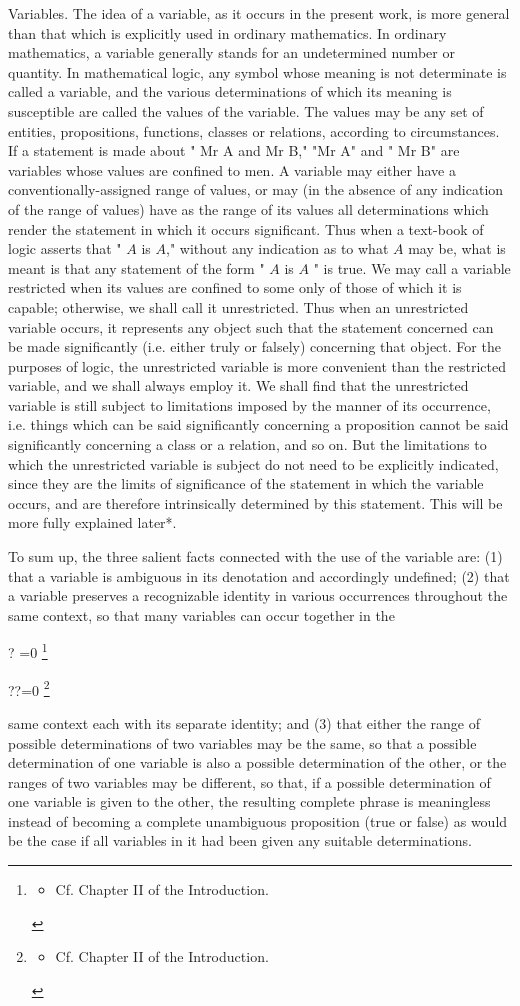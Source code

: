 \documentclass[10pt]{article}
\let\svthefootnote\thefootnote
\newcommand\blfootnotetext[1]{%
  \let\thefootnote\relax\footnote{#1}%
  \addtocounter{footnote}{-1}%
  \let\thefootnote\svthefootnote%
}
\let\svfootnotetext\footnotetext
\renewcommand\footnotetext[2][?]{%
  \if\relax#1\relax%
    \ifnum\value{footnote}=0\blfootnotetext{#2}\else\svfootnotetext{#2}\fi%
  \else%
    \if?#1\ifnum\value{footnote}=0\blfootnotetext{#2}\else\svfootnotetext{#2}\fi%
    \else\svfootnotetext[#1]{#2}\fi%
  \fi
}
\begin{document}
Variables. The idea of a variable, as it occurs in the present work, is more general than that which is explicitly used in ordinary mathematics. In ordinary mathematics, a variable generally stands for an undetermined number or quantity. In mathematical logic, any symbol whose meaning is not determinate is called a variable, and the various determinations of which its meaning is susceptible are called the values of the variable. The values may be any set of entities, propositions, functions, classes or relations, according to circumstances. If a statement is made about " Mr A and Mr B," "Mr A" and " Mr B" are variables whose values are confined to men. A variable may either have a conventionally-assigned range of values, or may (in the absence of any indication of the range of values) have as the range of its values all determinations which render the statement in which it occurs significant. Thus when a text-book of logic asserts that " $A$ is $A$," without any indication as to what $A$ may be, what is meant is that any statement of the form " $A$ is $A$ " is true. We may call a variable restricted when its values are confined to some only of those of which it is capable; otherwise, we shall call it unrestricted. Thus when an unrestricted variable occurs, it represents any object such that the statement concerned can be made significantly (i.e. either truly or falsely) concerning that object. For the purposes of logic, the unrestricted variable is more convenient than the restricted variable, and we shall always employ it. We shall find that the unrestricted variable is still subject to limitations imposed by the manner of its occurrence, i.e. things which can be said significantly concerning a proposition cannot be said significantly concerning a class or a relation, and so on. But the limitations to which the unrestricted variable is subject do not need to be explicitly indicated, since they are the limits of significance of the statement in which the variable occurs, and are therefore intrinsically determined by this statement. This will be more fully explained later*.

To sum up, the three salient facts connected with the use of the variable are: (1) that a variable is ambiguous in its denotation and accordingly undefined; (2) that a variable preserves a recognizable identity in various occurrences throughout the same context, so that many variables can occur together in the

\footnotetext{\begin{itemize}
  \item Cf. Chapter II of the Introduction.
\end{itemize}
}
same context each with its separate identity; and (3) that either the range of possible determinations of two variables may be the same, so that a possible determination of one variable is also a possible determination of the other, or the ranges of two variables may be different, so that, if a possible determination of one variable is given to the other, the resulting complete phrase is meaningless instead of becoming a complete unambiguous proposition (true or false) as would be the case if all variables in it had been given any suitable determinations.
\end{document}
